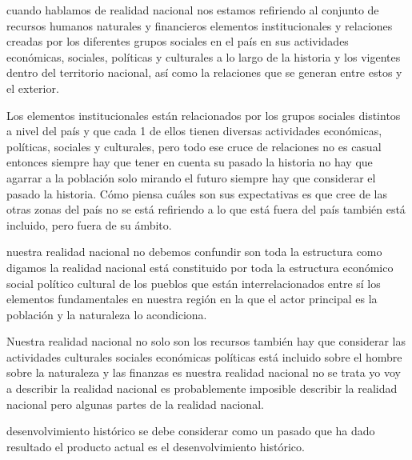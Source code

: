 \documentclass[
  a4paper,
]{article}
\begin{document}
cuando hablamos de realidad nacional nos estamos refiriendo al conjunto
de recursos humanos naturales y financieros elementos institucionales y
relaciones creadas por los diferentes grupos sociales en el país en sus
actividades económicas, sociales, políticas y culturales a lo largo de
la historia y los vigentes dentro del territorio nacional, así como la
relaciones que se generan entre estos y el exterior.

Los elementos institucionales están relacionados por los grupos sociales
distintos a nivel del país y que cada 1 de ellos tienen diversas
actividades económicas, políticas, sociales y culturales, pero todo ese
cruce de relaciones no es casual entonces siempre hay que tener en
cuenta su pasado la historia no hay que agarrar a la población solo
mirando el futuro siempre hay que considerar el pasado la historia. Cómo
piensa cuáles son sus expectativas es que cree de las otras zonas del
país no se está refiriendo a lo que está fuera del país también está
incluido, pero fuera de su ámbito.

nuestra realidad nacional no debemos confundir son toda la estructura
como digamos la realidad nacional está constituido por toda la
estructura económico social político cultural de los pueblos que están
interrelacionados entre sí los elementos fundamentales en nuestra región
en la que el actor principal es la población y la naturaleza lo
acondiciona.

Nuestra realidad nacional no solo son los recursos también hay que
considerar las actividades culturales sociales económicas políticas está
incluido sobre el hombre sobre la naturaleza y las finanzas es nuestra
realidad nacional no se trata yo voy a describir la realidad nacional es
probablemente imposible describir la realidad nacional pero algunas
partes de la realidad nacional.

desenvolvimiento histórico se debe considerar como un pasado que ha dado
resultado el producto actual es el desenvolvimiento histórico.


\printbibliography
\end{document}

